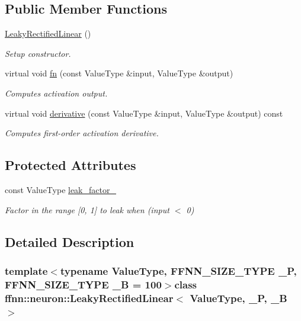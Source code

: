 \subsection*{Public Member Functions}
\begin{DoxyCompactItemize}
\item 
\hyperlink{classffnn_1_1neuron_1_1_leaky_rectified_linear_aedaef89cf5a9390b4ec610d1e7157bf8}{Leaky\-Rectified\-Linear} ()
\begin{DoxyCompactList}\small\item\em Setup constructor. \end{DoxyCompactList}\item 
virtual void \hyperlink{classffnn_1_1neuron_1_1_leaky_rectified_linear_a6a96858235a3c4a8195b27699032a849}{fn} (const Value\-Type \&input, Value\-Type \&output)
\begin{DoxyCompactList}\small\item\em Computes activation output. \end{DoxyCompactList}\item 
virtual void \hyperlink{classffnn_1_1neuron_1_1_leaky_rectified_linear_a1bb98dd03e854a69a7ba76b347ec4340}{derivative} (const Value\-Type \&input, Value\-Type \&output) const 
\begin{DoxyCompactList}\small\item\em Computes first-\/order activation derivative. \end{DoxyCompactList}\end{DoxyCompactItemize}
\subsection*{Protected Attributes}
\begin{DoxyCompactItemize}
\item 
const Value\-Type \hyperlink{classffnn_1_1neuron_1_1_leaky_rectified_linear_ab205c35e3123e8965efe63cd665020cb}{leak\-\_\-factor\-\_\-}
\begin{DoxyCompactList}\small\item\em Factor in the range \mbox{[}0, 1\mbox{]} to leak when (input $<$ 0) \end{DoxyCompactList}\end{DoxyCompactItemize}


\subsection{Detailed Description}
\subsubsection*{template$<$typename Value\-Type, F\-F\-N\-N\-\_\-\-S\-I\-Z\-E\-\_\-\-T\-Y\-P\-E \-\_\-\-P, F\-F\-N\-N\-\_\-\-S\-I\-Z\-E\-\_\-\-T\-Y\-P\-E \-\_\-\-B = 100$>$class ffnn\-::neuron\-::\-Leaky\-Rectified\-Linear$<$ Value\-Type, \-\_\-\-P, \-\_\-\-B $>$}

